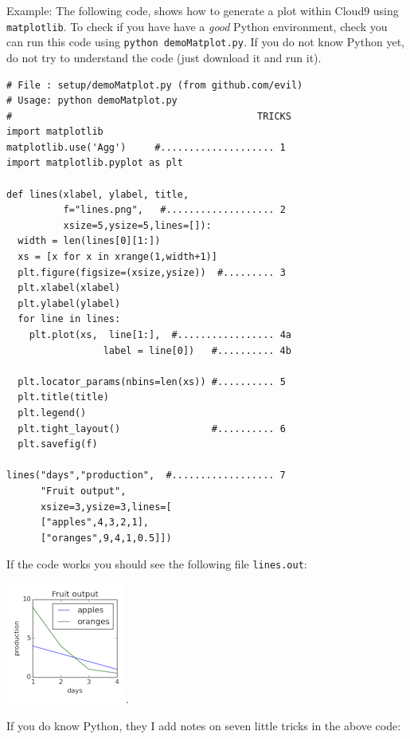 Example: The following code, shows how to generate a plot within Cloud9
using \texttt{matplotlib}. To check if you have have a \emph{good}
Python environment, check you can run this code using
\texttt{python\ demoMatplot.py}. If you do not know Python yet, do not
try to understand the code (just download it and run it).

\begin{lstlisting}
# File : setup/demoMatplot.py (from github.com/evil)
# Usage: python demoMatplot.py              
#                                           TRICKS
import matplotlib
matplotlib.use('Agg')     #.................... 1
import matplotlib.pyplot as plt 

def lines(xlabel, ylabel, title,
          f="lines.png",   #................... 2
          xsize=5,ysize=5,lines=[]): 
  width = len(lines[0][1:])
  xs = [x for x in xrange(1,width+1)] 
  plt.figure(figsize=(xsize,ysize))  #......... 3
  plt.xlabel(xlabel)
  plt.ylabel(ylabel) 
  for line in lines: 
    plt.plot(xs,  line[1:],  #................. 4a
                 label = line[0])   #.......... 4b
   
  plt.locator_params(nbins=len(xs)) #.......... 5
  plt.title(title)
  plt.legend()
  plt.tight_layout()                #.......... 6
  plt.savefig(f)

lines("days","production",  #.................. 7
      "Fruit output",
      xsize=3,ysize=3,lines=[
      ["apples",4,3,2,1],
      ["oranges",9,4,1,0.5]])
\end{lstlisting}

If the code works you should see the following file \texttt{lines.out}:

\includegraphics{img/matplotlib101.png}.

If you do know Python, they I add notes on seven little tricks in the
above code:

